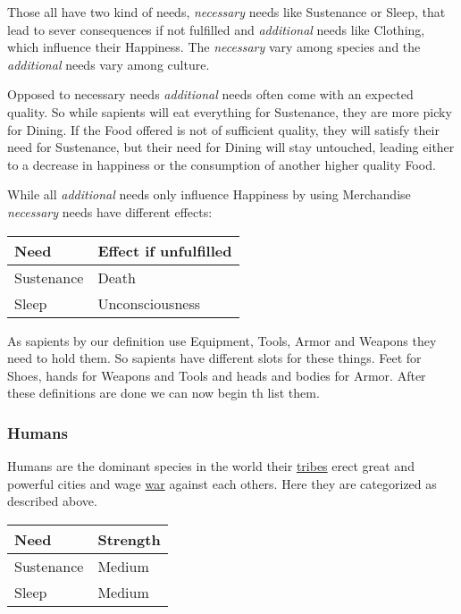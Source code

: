 Those all have two kind of needs, \emph{necessary} needs like \gls{Sustenance}
or \gls{Sleep}, that lead to sever consequences if not fulfilled and
\emph{additional} needs like \gls{Clothing}, which influence their Happiness.
The \emph{necessary} vary among species and the \emph{additional} needs vary
among culture.

Opposed to necessary needs \emph{additional} needs often come with an expected
quality. So while sapients will eat everything for \gls{Sustenance}, they are
more picky for \gls{Dining}. If the \gls{Food} offered is not of sufficient
quality, they will satisfy their need for \gls{Sustenance}, but their need for
\gls{Dining} will stay untouched, leading either to a decrease in happiness or
the consumption of another higher quality \gls{Food}.

While all \emph{additional} needs only influence Happiness by using
\gls{Merchandise} \emph{necessary} needs have different effects:

\begin{longtable}{ll}
	\toprule
	Need             & Effect if unfulfilled \\
	\midrule
	\Gls{Sustenance} & Death                 \\
	\Gls{Sleep}      & Unconsciousness       \\
	\bottomrule
\end{longtable}

As sapients by our definition use \gls{Equipment}, \glspl{Tool}, \gls{Armor}
and \glspl{Weapon} they need to hold them. So sapients have different slots for
these things. Feet for \glspl{Shoe}, hands for \glspl{Weapon} and \glspl{Tool}
and heads and bodies for \gls{Armor}. After these definitions are done we can
now begin th list them.

\subsubsection{Humans}

Humans are the dominant species in the world their \hyperref[ch:tribes]{tribes}
erect great and powerful cities and wage \hyperref[ch:Conflict]{war} against
each others. Here they are categorized as described above.

\begin{longtable}{ll}
	\toprule
	Need             & Strength \\
	\midrule
	\Gls{Sustenance} & Medium   \\
	\Gls{Sleep}      & Medium   \\
	\bottomrule
\end{longtable}

